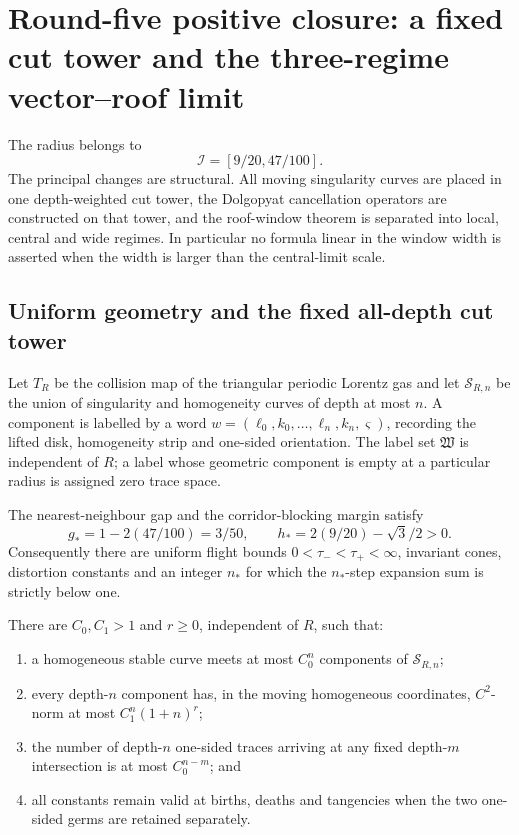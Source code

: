 \section{Round-five positive closure: a fixed cut tower and the three-regime vector--roof limit}
\label{sec:r5-a2}

The radius belongs to
\[
 \mathcal I=[9/20,47/100].
\]
The principal changes are structural.  All moving singularity curves are
placed in one depth-weighted cut tower, the Dolgopyat cancellation operators
are constructed on that tower, and the roof-window theorem is separated into
local, central and wide regimes.  In particular no formula linear in the
window width is asserted when the width is larger than the central-limit
scale.

\subsection{Uniform geometry and the fixed all-depth cut tower}

Let \(T_R\) be the collision map of the triangular periodic Lorentz gas and
let \(\mathcal S_{R,n}\) be the union of singularity and homogeneity curves of
depth at most \(n\).  A component is labelled by a word
\(w=(\ell_0,k_0,\ldots,\ell_n,k_n,\varsigma)\), recording the lifted disk,
homogeneity strip and one-sided orientation.  The label set \(\mathfrak W\)
is independent of \(R\); a label whose geometric component is empty at a
particular radius is assigned zero trace space.

The nearest-neighbour gap and the corridor-blocking margin satisfy
\[
 g_*=1-2(47/100)=3/50,
 \qquad h_*=2(9/20)-\sqrt3/2>0.
\]
Consequently there are uniform flight bounds
\(0<\tau_-<\tau_+<\infty\), invariant cones, distortion constants and an
integer \(n_*\) for which the \(n_*\)-step expansion sum is strictly below
one.

\begin{lemma}
\label{lem:r5-a2-complexity}
There are \(C_0,C_1>1\) and \(r\ge0\), independent of \(R\), such that:
\begin{enumerate}[label=(\roman*)]
\item a homogeneous stable curve meets at most \(C_0^n\) components of
      \(\mathcal S_{R,n}\);
\item every depth-\(n\) component has, in the moving homogeneous coordinates,
      \(C^2\)-norm at most \(C_1^n(1+n)^r\);
\item the number of depth-\(n\) one-sided traces arriving at any fixed
      depth-\(m\) intersection is at most \(C_0^{n-m}\); and
\item all constants remain valid at births, deaths and tangencies when the
      two one-sided germs are retained separately.
\end{enumerate}
\end{lemma}


